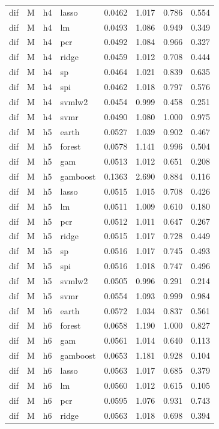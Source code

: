 \begin{ThreePartTable}
\begin{longtable}[t]{llclcccc}
dif & M & h4 & lasso & 0.0462 & 1.017 & 0.786 & 0.554\\
dif & M & h4 & lm & 0.0493 & 1.086 & 0.949 & 0.349\\
dif & M & h4 & pcr & 0.0492 & 1.084 & 0.966 & 0.327\\
dif & M & h4 & ridge & 0.0459 & 1.012 & 0.708 & 0.444\\
dif & M & h4 & sp & 0.0464 & 1.021 & 0.839 & 0.635\\
dif & M & h4 & spi & 0.0462 & 1.018 & 0.797 & 0.576\\
dif & M & h4 & svmlw2 & 0.0454 & 0.999 & 0.458 & 0.251\\
dif & M & h4 & svmr & 0.0490 & 1.080 & 1.000 & 0.975\\
\addlinespace
dif & M & h5 & earth & 0.0527 & 1.039 & 0.902 & 0.467\\
dif & M & h5 & forest & 0.0578 & 1.141 & 0.996 & 0.504\\
dif & M & h5 & gam & 0.0513 & 1.012 & 0.651 & 0.208\\
dif & M & h5 & gamboost & 0.1363 & 2.690 & 0.884 & 0.116\\
dif & M & h5 & lasso & 0.0515 & 1.015 & 0.708 & 0.426\\
dif & M & h5 & lm & 0.0511 & 1.009 & 0.610 & 0.180\\
dif & M & h5 & pcr & 0.0512 & 1.011 & 0.647 & 0.267\\
dif & M & h5 & ridge & 0.0515 & 1.017 & 0.728 & 0.449\\
dif & M & h5 & sp & 0.0516 & 1.017 & 0.745 & 0.493\\
dif & M & h5 & spi & 0.0516 & 1.018 & 0.747 & 0.496\\
dif & M & h5 & svmlw2 & 0.0505 & 0.996 & 0.291 & 0.214\\
dif & M & h5 & svmr & 0.0554 & 1.093 & 0.999 & 0.984\\
\addlinespace
dif & M & h6 & earth & 0.0572 & 1.034 & 0.837 & 0.561\\
dif & M & h6 & forest & 0.0658 & 1.190 & 1.000 & 0.827\\
dif & M & h6 & gam & 0.0561 & 1.014 & 0.640 & 0.113\\
dif & M & h6 & gamboost & 0.0653 & 1.181 & 0.928 & 0.104\\
dif & M & h6 & lasso & 0.0563 & 1.017 & 0.685 & 0.379\\
dif & M & h6 & lm & 0.0560 & 1.012 & 0.615 & 0.105\\
dif & M & h6 & pcr & 0.0595 & 1.076 & 0.931 & 0.743\\
dif & M & h6 & ridge & 0.0563 & 1.018 & 0.698 & 0.394\\

\end{longtable}
\end{ThreePartTable}
